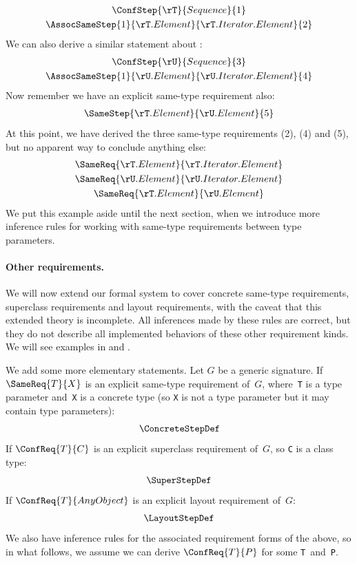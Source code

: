 \documentclass[../generics]{subfiles}
\begin{document}
\begin{example}
\begin{gather*}
\ConfStep{\rT}{Sequence}{1}\\
\AssocSameStep{1}{\rT.Element}{\rT.Iterator.Element}{2}
\end{gather*}
We can also derive a similar statement about \rU:
\begin{gather*}
\ConfStep{\rU}{Sequence}{3}\\
\AssocSameStep{1}{\rU.Element}{\rU.Iterator.Element}{4}
\end{gather*}
Now remember we have an explicit same-type requirement also:
\begin{gather*}
\SameStep{\rT.Element}{\rU.Element}{5}
\end{gather*}
At this point, we have derived the three same-type requirements (2), (4) and (5), but no apparent way to conclude anything else:
\begin{gather*}
\SameReq{\rT.Element}{\rT.Iterator.Element}\\
\SameReq{\rU.Element}{\rU.Iterator.Element}\\
\SameReq{\rT.Element}{\rU.Element}
\end{gather*}
We put this example aside until the next section, when we introduce more inference rules for working with same-type requirements between type parameters.
\end{example}

\paragraph{Other requirements.}
We will now extend our formal system to cover concrete same-type requirements, superclass requirements and layout requirements, with the caveat that this extended theory is incomplete. All inferences made by these rules are correct, but they do not describe all implemented behaviors of these other requirement kinds. We will see examples in  and .

We add some more elementary statements. Let $G$ be a generic signature. If $\SameReq{T}{X}$ is an explicit same-type requirement of~$G$, where~\texttt{T} is a type parameter and~\texttt{X} is a concrete type (so \texttt{X} is not a type parameter but it may contain type parameters):
\begin{gather*}
\ConcreteStepDef
\end{gather*}
If $\ConfReq{T}{C}$ is an explicit superclass requirement of~$G$, so \texttt{C} is a class type:
\begin{gather*}
\SuperStepDef
\end{gather*}
If $\ConfReq{T}{AnyObject}$ is an explicit layout requirement of~$G$:
\begin{gather*}
\LayoutStepDef
\end{gather*}
We also have inference rules for the associated requirement forms of the above, so in what follows, we assume we can derive $\ConfReq{T}{P}$ for some \texttt{T}~and~\texttt{P}.
\end{document}
